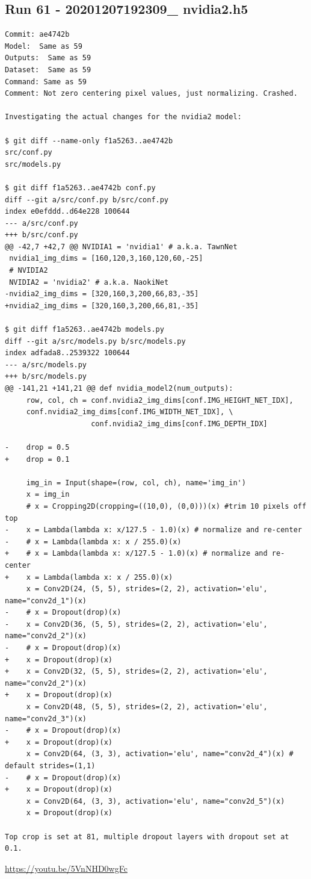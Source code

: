 \subsection{Run 61 - 20201207192309\_ nvidia2.h5 }
\label{app_res:XX}
\begin{verbatim}
Commit: ae4742b
Model:  Same as 59
Outputs:  Same as 59
Dataset:  Same as 59
Command: Same as 59
Comment: Not zero centering pixel values, just normalizing. Crashed.

Investigating the actual changes for the nvidia2 model:

$ git diff --name-only f1a5263..ae4742b
src/conf.py
src/models.py

$ git diff f1a5263..ae4742b conf.py
diff --git a/src/conf.py b/src/conf.py
index e0efddd..d64e228 100644
--- a/src/conf.py
+++ b/src/conf.py
@@ -42,7 +42,7 @@ NVIDIA1 = 'nvidia1' # a.k.a. TawnNet
 nvidia1_img_dims = [160,120,3,160,120,60,-25]
 # NVIDIA2
 NVIDIA2 = 'nvidia2' # a.k.a. NaokiNet
-nvidia2_img_dims = [320,160,3,200,66,83,-35]
+nvidia2_img_dims = [320,160,3,200,66,81,-35]

$ git diff f1a5263..ae4742b models.py
diff --git a/src/models.py b/src/models.py
index adfada8..2539322 100644
--- a/src/models.py
+++ b/src/models.py
@@ -141,21 +141,21 @@ def nvidia_model2(num_outputs):
     row, col, ch = conf.nvidia2_img_dims[conf.IMG_HEIGHT_NET_IDX],
     conf.nvidia2_img_dims[conf.IMG_WIDTH_NET_IDX], \
                    conf.nvidia2_img_dims[conf.IMG_DEPTH_IDX]
 
-    drop = 0.5
+    drop = 0.1
 
     img_in = Input(shape=(row, col, ch), name='img_in')
     x = img_in
     # x = Cropping2D(cropping=((10,0), (0,0)))(x) #trim 10 pixels off top
-    x = Lambda(lambda x: x/127.5 - 1.0)(x) # normalize and re-center
-    # x = Lambda(lambda x: x / 255.0)(x)
+    # x = Lambda(lambda x: x/127.5 - 1.0)(x) # normalize and re-center
+    x = Lambda(lambda x: x / 255.0)(x)
     x = Conv2D(24, (5, 5), strides=(2, 2), activation='elu', name="conv2d_1")(x)
-    # x = Dropout(drop)(x)
-    x = Conv2D(36, (5, 5), strides=(2, 2), activation='elu', name="conv2d_2")(x)
-    # x = Dropout(drop)(x)
+    x = Dropout(drop)(x)
+    x = Conv2D(32, (5, 5), strides=(2, 2), activation='elu', name="conv2d_2")(x)
+    x = Dropout(drop)(x)
     x = Conv2D(48, (5, 5), strides=(2, 2), activation='elu', name="conv2d_3")(x)
-    # x = Dropout(drop)(x)
+    x = Dropout(drop)(x)
     x = Conv2D(64, (3, 3), activation='elu', name="conv2d_4")(x) # default strides=(1,1)
-    # x = Dropout(drop)(x)
+    x = Dropout(drop)(x)
     x = Conv2D(64, (3, 3), activation='elu', name="conv2d_5")(x)
     x = Dropout(drop)(x)

Top crop is set at 81, multiple dropout layers with dropout set at 0.1.
\end{verbatim}
\url{https://youtu.be/5VnNHD0wgFc}


